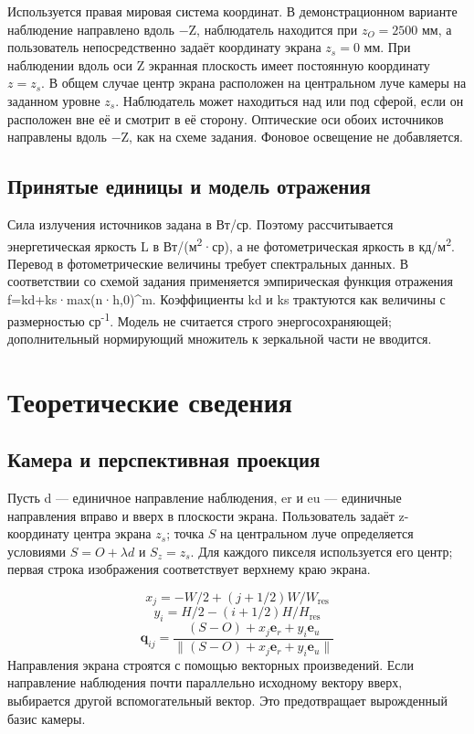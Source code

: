 \documentclass[a4paper,12pt]{article}
\begin{document}
Используется правая мировая система координат. В демонстрационном варианте наблюдение направлено вдоль \ensuremath{-}Z, наблюдатель находится при $z_O=2500$ мм, а пользователь непосредственно задаёт координату экрана $z_s=0$ мм. При наблюдении вдоль оси Z экранная плоскость имеет постоянную координату $z=z_s$. В общем случае центр экрана расположен на центральном луче камеры на заданном уровне $z_s$. Наблюдатель может находиться над или под сферой, если он расположен вне её и смотрит в её сторону. Оптические оси обоих источников направлены вдоль \ensuremath{-}Z, как на схеме задания. Фоновое освещение не добавляется.

\subsection{Принятые единицы и модель отражения}
Сила излучения источников задана в Вт/ср. Поэтому рассчитывается энергетическая яркость L в Вт/(м\textsuperscript{2}·ср), а не фотометрическая яркость в кд/м\textsuperscript{2}. Перевод в фотометрические величины требует спектральных данных. В соответствии со схемой задания применяется эмпирическая функция отражения f=kd+ks·max(n·h,0)\textasciicircum{}m. Коэффициенты kd и ks трактуются как величины с размерностью ср\textsuperscript{-}\textsuperscript{1}. Модель не считается строго энергосохраняющей; дополнительный нормирующий множитель к зеркальной части не вводится.

\clearpage
\section{Теоретические сведения}
\subsection{Камера и перспективная проекция}
Пусть d — единичное направление наблюдения, er и eu — единичные направления вправо и вверх в плоскости экрана. Пользователь задаёт z-координату центра экрана $z_s$; точка $S$ на центральном луче определяется условиями $S=O+\lambda d$ и $S_z=z_s$. Для каждого пикселя используется его центр; первая строка изображения соответствует верхнему краю экрана.

\begin{equation}
x_j=-W/2+(j+1/2)W/W_{\mathrm{res}}
\end{equation}
\begin{equation}
y_i=H/2-(i+1/2)H/H_{\mathrm{res}}
\end{equation}
\begin{equation}
\mathbf{q}_{ij}=\frac{(S-O)+x_j\mathbf{e}_r+y_i\mathbf{e}_u}{\|(S-O)+x_j\mathbf{e}_r+y_i\mathbf{e}_u\|}
\end{equation}
Направления экрана строятся с помощью векторных произведений. Если направление наблюдения почти параллельно исходному вектору вверх, выбирается другой вспомогательный вектор. Это предотвращает вырожденный базис камеры.
\end{document}
